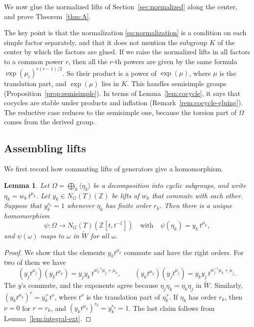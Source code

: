 \documentclass[psamsfonts]{amsart}
\newtheorem{lem}[thm]{Lemma}
\theoremstyle{definition}
\theoremstyle{remark}
\numberwithin{equation}{section}
\newcommand{\Z}{\mathbb{Z}}   %
\newcommand{\extw}{\widetilde{W}}
\newcommand{\ra}{\rightarrow}
\numberwithin{equation}{section}
\newcommand{\om}{\omega}
\newcommand{\Om}{\Omega}
\theoremstyle{plain}
\begin{document}
We now glue the normalized lifts of Section~\ref{sec:normalized} along the center, and prove Theorem~\ref{thm:A}.

The key point is that the normalization \eqref{eq:normalization} is a condition on each simple factor separately, and that it does not mention the subgroup $K$ of the center by which the factors are glued. If we raise the normalized lifts in all factors to a common power $r$, then all the $r$-th powers are given by the same formula $\exp(\mu_i)^{r(r-1)/2}$. So their product is a power of $\exp(\mu)$, where $\mu$ is the translation part, and $\exp(\mu)$ lies in $K$. This handles semisimple groups (Proposition~\ref{prop:semisimple}). In terms of Lemma~\ref{lem:cocycle}, it says that cocycles are stable under products and inflation (Remark~\ref{rem:cocycle-gluing}). The reductive case reduces to the semisimple one, because the torsion part of $\Om$ comes from the derived group.

\subsection{Assembling lifts}
We first record how commuting lifts of generators give a homomorphism.

\begin{lem}\label{lem:assemble}
Let $\Om=\bigoplus_k\langle\eta_k\rangle$ be a decomposition into cyclic subgroups, and write $\eta_k=w_k\,t^{\mu_k}$. Let $y_k\in N_G(T)(\Z)$ be lifts of $w_k$ that commute with each other. Suppose that $y_k^{r_k}=1$ whenever $\eta_k$ has finite order $r_k$. Then there is a unique homomorphism
\[
\psi\colon\Om\ra N_G(T)(\Z[t,t^{-1}])\quad\text{with}\quad\psi(\eta_k)=y_k\,t^{\mu_k},
\]
and $\psi(\om)$ maps to $\om$ in $\extw$ for all $\om$.
\end{lem}

\begin{proof}
We show that the elements $y_kt^{\mu_k}$ commute and have the right orders. For two of them we have
\[
(y_jt^{\mu_j})(y_kt^{\mu_k})=y_jy_k\,t^{w_k^{-1}\mu_j+\mu_k},\qquad (y_kt^{\mu_k})(y_jt^{\mu_j})=y_ky_j\,t^{w_j^{-1}\mu_k+\mu_j}.
\]
The $y$'s commute, and the exponents agree because $\eta_j\eta_k=\eta_k\eta_j$ in $\extw$. Similarly, $(y_kt^{\mu_k})^{r}=y_k^{\,r}\,t^{\nu}$, where $t^{\nu}$ is the translation part of $\eta_k^{\,r}$. If $\eta_k$ has order $r_k$, then $\nu=0$ for $r=r_k$, and $(y_kt^{\mu_k})^{r_k}=y_k^{r_k}=1$. The last claim follows from Lemma~\ref{lem:integral-ext}.
\end{proof}
\end{document}

